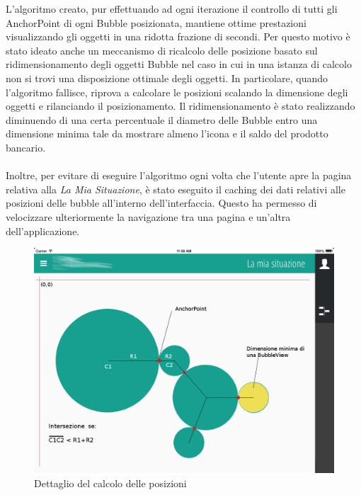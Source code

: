 L'algoritmo creato, pur effettuando ad ogni iterazione il controllo di tutti gli AnchorPoint di ogni Bubble posizionata, mantiene ottime prestazioni visualizzando gli oggetti in una ridotta frazione di secondi. Per questo motivo è stato ideato anche un meccanismo di ricalcolo delle posizione basato sul ridimensionamento degli oggetti Bubble nel caso in cui in una istanza di calcolo non si trovi una disposizione ottimale degli oggetti.  
In particolare, quando l'algoritmo fallisce, riprova a calcolare le posizioni scalando la dimensione degli oggetti e rilanciando il posizionamento. Il ridimensionamento è stato realizzando diminuendo di una certa percentuale il diametro delle Bubble entro una dimensione minima tale da mostrare almeno l'icona e il saldo del prodotto bancario.
\\\\
Inoltre, per evitare di eseguire l'algoritmo ogni volta che l'utente apre la pagina relativa alla \emph{La Mia Situazione}, è stato eseguito il caching dei dati relativi alle posizioni delle bubble all'interno dell'interfaccia. Questo ha permesso di velocizzare ulteriormente la navigazione tra una pagina e un'altra dell'applicazione.
\begin{figure}[!htbp]
\centering
\includegraphics[scale=0.4]{dettagli/bubblesInView.png}
\caption{Dettaglio del calcolo delle posizioni}
\label{fig:bubblesInView}
\end{figure}
